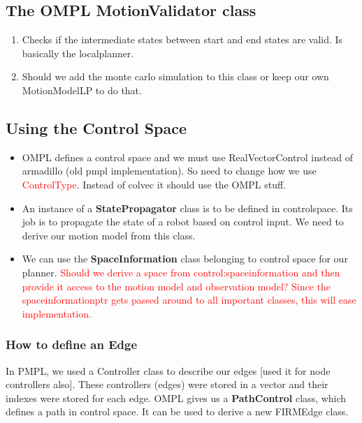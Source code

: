 \subsection{The OMPL MotionValidator class}

\begin{enumerate}
 \item Checks if the intermediate states between start and end states are valid. Is basically the localplanner.
 \item Should we add the monte carlo simulation to this class or keep our own MotionModelLP to do that.
\end{enumerate}

\subsection{Using the Control Space}

\begin{itemize}
 \item OMPL defines a control space and we must use RealVectorControl instead of armadillo (old pmpl implementation). So need to change how we use \textcolor{red}{ControlType}. Instead of colvec it should use the OMPL stuff. 
 
 \item An instance of a \textbf{StatePropagator} class is to be defined in controlspace. Its job is to propagate the state of a robot based on control input. We need to  derive      our motion model from this class. 
 
  \item We can use the \textbf{SpaceInformation} class belonging to control space for our planner. \textcolor{red}{Should we derive a space from control:spaceinformation and then provide it access to the motion model and observation model? Since the spaceinformationptr gets passed around to all important classes, this will ease implementation.} 

 \end{itemize}

 \subsubsection{How to define an Edge}
 In PMPL, we used a Controller class to describe our edges [used it for node controllers also]. These controllers (edges) were stored in a vector and 
 their indexes were stored for each edge. OMPL gives us a \textbf{PathControl} class, which defines a path in control space. It can be used to derive a new
 FIRMEdge class.

